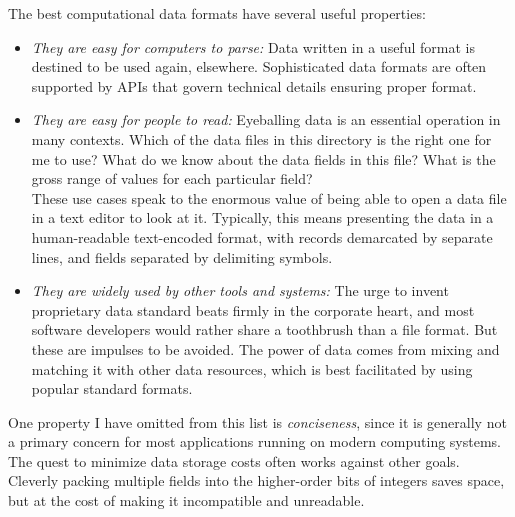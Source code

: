 \documentclass[10pt]{article}
\begin{document}
The best computational data formats have several useful properties:
\begin{itemize}
  \item \textit{They are easy for computers to parse:} Data written in a useful format is destined to be used again, elsewhere. Sophisticated data formats are often supported by APIs that govern technical details ensuring proper format.
  \item \textit{They are easy for people to read:} Eyeballing data is an essential operation in many contexts. Which of the data files in this directory is the right one for me to use? What do we know about the data fields in this file? What is the gross range of values for each particular field?\\
These use cases speak to the enormous value of being able to open a data file in a text editor to look at it. Typically, this means presenting the data in a human-readable text-encoded format, with records demarcated by separate lines, and fields separated by delimiting symbols.
  \item \textit{They are widely used by other tools and systems:} The urge to invent proprietary data standard beats firmly in the corporate heart, and most software developers would rather share a toothbrush than a file format. But these are impulses to be avoided. The power of data comes from mixing and matching it with other data resources, which is best facilitated by using popular standard formats.
\end{itemize}

One property I have omitted from this list is \textit{conciseness}, since it is generally not a primary concern for most applications running on modern computing systems. The quest to minimize data storage costs often works against other goals. Cleverly packing multiple fields into the higher-order bits of integers saves space, but at the cost of making it incompatible and unreadable.
\end{document}
